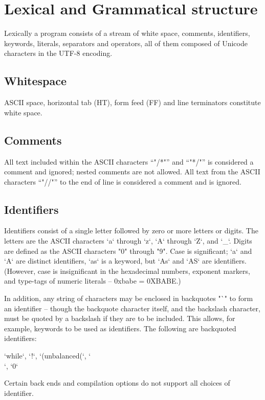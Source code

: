 \chapter{Lexical and Grammatical structure}


Lexically a program consists of a stream of white space, comments,
identifiers, keywords, literals, separators and operators, all of them
composed of Unicode characters in the UTF-8 encoding. 

\section{Whitespace}
ASCII space, horizontal tab (HT), form feed (FF) and line
terminators constitute white space.

\section{Comments}
All text included within the ASCII characters ``\xcd"/*"'' and
``\xcd"*/"'' is
considered a comment and ignored; nested comments are not
allowed.  All text from the ASCII characters
``\xcd"//"'' to the end of line is considered a comment and is ignored.

\section{Identifiers}

Identifiers consist of a single letter followed by zero or more letters or
digits. The letters are the ASCII characters \xcd`a` through \xcd`z`, \xcd`A`
through \xcd`Z`, and \xcd`_`. Digits are defined as the ASCII characters
\xcd"0" through \xcd"9". Case is significant; \xcd`a` and \xcd`A` are distinct
identifiers, \xcd`as` is a keyword, but \xcd`As` and \xcd`AS` are identifiers.
(However, case is insignificant in the hexadecimal numbers, exponent markers,
and type-tags of numeric literals -- 0xbabe = 0XBABE.)

In addition, any string of characters may be enclosed in backquotes \xcd"`" to
form an identifier -- though the backquote character itself, and the backslash 
character, must be quoted by a backslash if they are to be included.
This allows,
for example, keywords to be used as identifiers.  The following are
backquoted identifiers: 
% 
\begin{xten}
`while`, `!`, `(unbalanced(`,  `\`\\`, `0`
\end{xten}
\noindent
Certain  back ends and compilation options do not support all choices of
identifier.  

